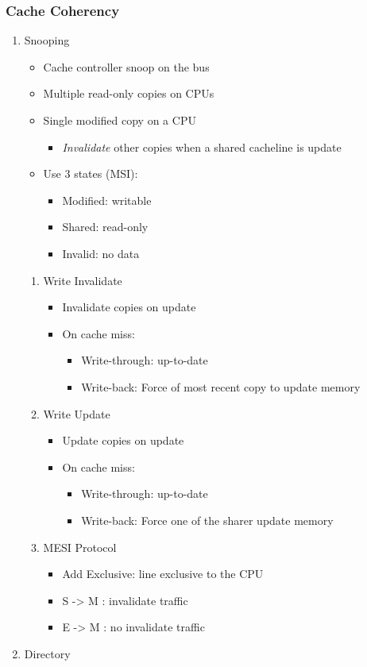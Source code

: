 \documentclass[11pt]{article}
\begin{document}
\subsubsection{Cache Coherency}
\label{sec:orgbaf87a6}
\begin{enumerate}
\item Snooping
\label{sec:org7081db9}
\begin{itemize}
\item Cache controller snoop on the bus
\item Multiple read-only copies on CPUs
\item Single modified copy on a CPU
\begin{itemize}
\item \emph{Invalidate} other copies when a shared cacheline is update
\end{itemize}
\item Use 3 states (MSI):
\begin{itemize}
\item Modified: writable
\item Shared: read-only
\item Invalid: no data
\end{itemize}
\end{itemize}
\begin{enumerate}
\item Write Invalidate
\label{sec:org202dc76}
\begin{itemize}
\item Invalidate copies on update
\item On cache miss:
\begin{itemize}
\item Write-through: up-to-date
\item Write-back: Force of most recent copy to update memory
\end{itemize}
\end{itemize}
\item Write Update
\label{sec:orgcfdf139}
\begin{itemize}
\item Update copies on update
\item On cache miss:
\begin{itemize}
\item Write-through: up-to-date
\item Write-back: Force one of the sharer update memory
\end{itemize}
\end{itemize}
\item MESI Protocol
\label{sec:org991be4f}
\begin{itemize}
\item Add Exclusive: line exclusive to the CPU
\item S -> M : invalidate traffic
\item E -> M : no invalidate traffic
\end{itemize}
\end{enumerate}
\item Directory
\label{sec:org69c226c}
\end{enumerate}
\end{document}
